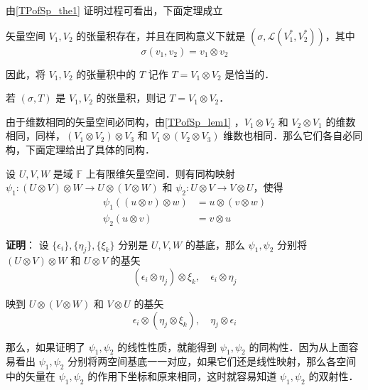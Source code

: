 由\autoref{TPofSp_the1} 证明过程可看出，下面定理成立
\begin{theorem}{}
矢量空间 $V_1,V_2$ 的张量积存在，并且在同构意义下就是 $(\sigma,\mathcal L(V_1^*,V_2^*))$，其中
\begin{equation}
\sigma(v_1,v_2)=v_1\otimes v_2
\end{equation}
\end{theorem}
 
 因此，将 $V_1,V_2$ 的张量积中的 $T$ 记作 $T=V_1\otimes V_2$ 是恰当的．

\begin{definition}{}
若 $(\sigma ,T)$ 是 $V_1,V_2$ 的张量积，则记 $T=V_1\otimes V_2$．
\end{definition}

由于维数相同的矢量空间必同构，由\autoref{TPofSp_lem1} ，$V_1\otimes V_2$ 和 $V_2\otimes V_1$ 的维数相同，同样，$(V_1\otimes V_2)\otimes V_3$ 和 $V_1\otimes( V_2\otimes V_3)$ 维数也相同．那么它们各自必同构，下面定理给出了具体的同构．
\begin{theorem}{}\label{TPofSp_the2}
设 $U,V,W$ 是域 $\mathbb F$ 上有限维矢量空间．则有同构映射 $\psi_1:(U\otimes V)\otimes W\rightarrow U\otimes(V\otimes W)$ 和 $\psi_2:U\otimes V\rightarrow V\otimes U$，使得
\begin{equation}
\begin{aligned}
\psi_1((u\otimes v)\otimes w)&=u\otimes(v\otimes w)\\
\psi_2(u\otimes v)&=v\otimes u
\end{aligned}
\end{equation}
\end{theorem}
\textbf{证明}： 设 $\{\epsilon_i\},\{\eta_j\},\{\xi_k\}$ 分别是 $U,V,W$ 的基底，那么 $\psi_1,\psi_2$ 分别将 $(U\otimes V)\otimes W$ 和 $U\otimes V$ 的基矢
\begin{equation}
(\epsilon_i\otimes\eta_j)\otimes\xi_k,\quad \epsilon_i\otimes\eta_j
\end{equation}

映到 $U\otimes (V\otimes W)$ 和 $V\otimes U$ 的基矢 
\begin{equation}
\epsilon_i\otimes(\eta_j\otimes\xi_k),\quad \eta_j\otimes\epsilon_i
\end{equation}

那么，如果证明了 $\psi_1,\psi_2$ 的线性性质，就能得到 $\psi_1,\psi_2$ 的同构性．因为从上面容易看出 $\psi_1,\psi_2$ 分别将两空间基底一一对应，如果它们还是线性映射，那么各空间中的矢量在 $\psi_1,\psi_2$ 的作用下坐标和原来相同，这时就容易知道 $\psi_1,\psi_2$ 的双射性．

